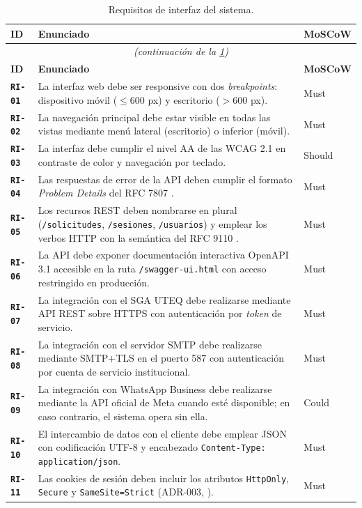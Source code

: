 \documentclass[11pt,a4paper,twoside]{report}
\newcommand{\reqid}[1]{\texttt{\textbf{#1}}}
\begin{document}
\begin{longtable}{@{}p{1.2cm}p{12.5cm}p{1.3cm}@{}}
    \caption{Requisitos de interfaz del sistema.}
    \label{tab:ri}\\
    \toprule
    \textbf{ID} & \textbf{Enunciado} & \textbf{MoSCoW} \\
    \midrule
    \endfirsthead
    \multicolumn{3}{c}{\itshape (continuaci\'on de la \cref{tab:ri})}\\
    \toprule
    \textbf{ID} & \textbf{Enunciado} & \textbf{MoSCoW} \\
    \midrule
    \endhead

    \reqid{RI-01} & La interfaz web debe ser responsive con dos \emph{breakpoints}: dispositivo m\'ovil ($\leq 600$ px) y escritorio ($> 600$ px). & Must \\
    \reqid{RI-02} & La navegaci\'on principal debe estar visible en todas las vistas mediante men\'u lateral (escritorio) o inferior (m\'ovil). & Must \\
    \reqid{RI-03} & La interfaz debe cumplir el nivel AA de las WCAG 2.1 en contraste de color y navegaci\'on por teclado. & Should \\
    \reqid{RI-04} & Las respuestas de error de la API deben cumplir el formato \emph{Problem Details} del RFC 7807 \cite{rfc7807}. & Must \\
    \reqid{RI-05} & Los recursos REST deben nombrarse en plural (\texttt{/solicitudes}, \texttt{/sesiones}, \texttt{/usuarios}) y emplear los verbos HTTP con la sem\'antica del RFC 9110 \cite{rfc9110}. & Must \\
    \reqid{RI-06} & La API debe exponer documentaci\'on interactiva OpenAPI 3.1 accesible en la ruta \texttt{/swagger-ui.html} con acceso restringido en producci\'on. & Must \\
    \reqid{RI-07} & La integraci\'on con el SGA UTEQ debe realizarse mediante API REST sobre HTTPS con autenticaci\'on por \emph{token} de servicio. & Must \\
    \reqid{RI-08} & La integraci\'on con el servidor SMTP debe realizarse mediante SMTP+TLS en el puerto 587 con autenticaci\'on por cuenta de servicio institucional. & Must \\
    \reqid{RI-09} & La integraci\'on con WhatsApp Business debe realizarse mediante la API oficial de Meta cuando est\'e disponible; en caso contrario, el sistema opera sin ella. & Could \\
    \reqid{RI-10} & El intercambio de datos con el cliente debe emplear JSON con codificaci\'on UTF-8 y encabezado \texttt{Content-Type: application/json}. & Must \\
    \reqid{RI-11} & Las cookies de sesi\'on deben incluir los atributos \texttt{HttpOnly}, \texttt{Secure} y \texttt{SameSite=Strict} (ADR-003, \cite{jones2015jwt}). & Must \\
    \bottomrule
\end{longtable}
\end{document}
